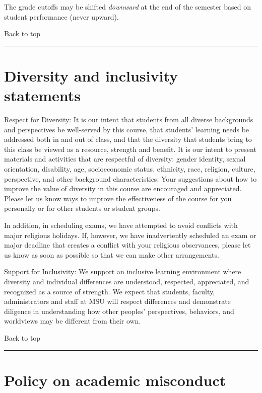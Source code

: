 \documentclass[
]{article}
\begin{document}
The grade cutoffs may be shifted \emph{downward} at the end of the
semester based on student performance (never upward).

Back to top

\begin{center}\rule{0.5\linewidth}{0.5pt}\end{center}

\section{Diversity and inclusivity
statements}\label{diversity-and-inclusivity-statements}

Respect for Diversity: It is our intent that students from all diverse
backgrounds and perspectives be well-served by this course, that
students' learning needs be addressed both in and out of class, and that
the diversity that students bring to this class be viewed as a resource,
strength and benefit. It is our intent to present materials and
activities that are respectful of diversity: gender identity, sexual
orientation, disability, age, socioeconomic status, ethnicity, race,
religion, culture, perspective, and other background characteristics.
Your suggestions about how to improve the value of diversity in this
course are encouraged and appreciated. Please let us know ways to
improve the effectiveness of the course for you personally or for other
students or student groups.

In addition, in scheduling exams, we have attempted to avoid conflicts
with major religious holidays. If, however, we have inadvertently
scheduled an exam or major deadline that creates a conflict with your
religious observances, please let us know as soon as possible so that we
can make other arrangements.

Support for Inclusivity: We support an inclusive learning environment
where diversity and individual differences are understood, respected,
appreciated, and recognized as a source of strength. We expect that
students, faculty, administrators and staff at MSU will respect
differences and demonstrate diligence in understanding how other
peoples' perspectives, behaviors, and worldviews may be different from
their own.

Back to top

\begin{center}\rule{0.5\linewidth}{0.5pt}\end{center}

\section{Policy on academic
misconduct}\label{policy-on-academic-misconduct}
\end{document}
